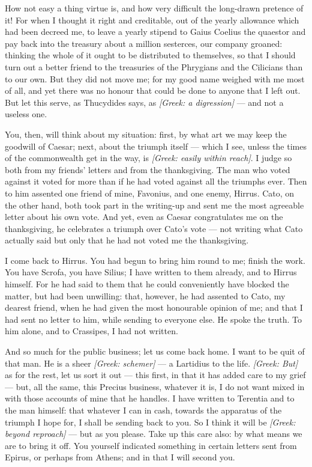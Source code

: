  How not easy a thing virtue is, and how very difficult the long-drawn pretence of it! For when I thought it right and creditable, out of the yearly allowance which had been decreed me, to leave a yearly stipend to Gaius Coelius the quaestor and pay back into the treasury about a million sesterces, our company groaned: thinking the whole of it ought to be distributed to themselves, so that I should turn out a better friend to the treasuries of the Phrygians and the Cilicians than to our own. But they did not move me; for my good name weighed with me most of all, and yet there was no honour that could be done to anyone that I left out. But let this serve, as Thucydides says, as \textit{[Greek: a digression]} --- and not a useless one.

 You, then, will think about my situation: first, by what art we may keep the goodwill of Caesar; next, about the triumph itself --- which I see, unless the times of the commonwealth get in the way, is \textit{[Greek: easily within reach]}. I judge so both from my friends' letters and from the thanksgiving. The man who voted against it voted for more than if he had voted against all the triumphs ever. Then to him assented one friend of mine, Favonius, and one enemy, Hirrus. Cato, on the other hand, both took part in the writing-up and sent me the most agreeable letter about his own vote. And yet, even as Caesar congratulates me on the thanksgiving, he celebrates a triumph over Cato's vote --- not writing what Cato actually said but only that he had not voted me the thanksgiving.

 I come back to Hirrus. You had begun to bring him round to me; finish the work. You have Scrofa, you have Silius; I have written to them already, and to Hirrus himself. For he had said to them that he could conveniently have blocked the matter, but had been unwilling: that, however, he had assented to Cato, my dearest friend, when he had given the most honourable opinion of me; and that I had sent no letter to him, while sending to everyone else. He spoke the truth. To him alone, and to Crassipes, I had not written.

 And so much for the public business; let us come back home. I want to be quit of that man. He is a sheer \textit{[Greek: schemer]} --- a Lartidius to the life. \textit{[Greek: But]} as for the rest, let us sort it out --- this first, in that it has added care to my grief --- but, all the same, this Precius business, whatever it is, I do not want mixed in with those accounts of mine that he handles. I have written to Terentia and to the man himself: that whatever I can in cash, towards the apparatus of the triumph I hope for, I shall be sending back to you. So I think it will be \textit{[Greek: beyond reproach]} --- but as you please. Take up this care also: by what means we are to bring it off. You yourself indicated something in certain letters sent from Epirus, or perhaps from Athens; and in that I will second you.
